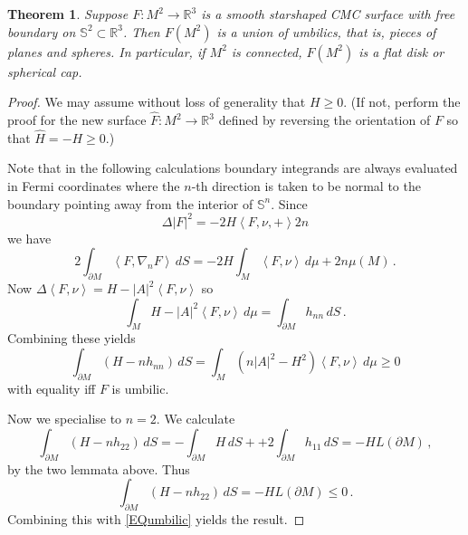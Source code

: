 \documentclass[10pt]{amsart}
\newcommand{\IP}[2]{\left< #1 , #2 \right>}
\newcommand{\R}{\ensuremath{\mathbb{R}}}
\renewcommand{\S}{\ensuremath{\mathbb{S}}}
\newtheorem{thm}{Theorem}[section]
\theoremstyle{remark}
\begin{document}
\begin{thm}
Suppose $F:M^2\rightarrow\R^3$ is a smooth starshaped CMC surface with free boundary on
$\S^2\subset\R^{3}$.
Then $F(M^2)$ is a union of umbilics, that is, pieces of planes and spheres. In
particular, if $M^2$ is connected, $F(M^2)$ is a flat disk or spherical cap.
\end{thm}
\begin{proof}
We may assume without loss of generality that $H \ge 0$. (If not, perform the
proof for the new surface $\hat F:M^2\rightarrow\R^3$ defined by reversing the
orientation of $F$ so that $\hat H = -H \ge 0$.)

Note that in the following calculations boundary integrands are always
evaluated in Fermi coordinates where the $n$-th direction is taken to be normal
to the boundary pointing away from the interior of $\S^n$.
Since
\[
\Delta |F|^2 = -2H\IP{F,\nu} + 2n
\]
we have
\[
2\int_{\partial M} \IP{F}{\nabla_n F}\,dS
 = -2H\int_M \IP{F}{\nu}\,d\mu + 2n\mu(M)
\,.
\]
Now $\Delta \IP{F}{\nu} = H - |A|^2\IP{F}{\nu}$ so
\[
\int_M H-|A|^2\IP{F}{\nu}\,d\mu
 = \int_{\partial M} h_{nn}\,dS
\,.
\]
Combining these yields
\begin{equation}
\int_{\partial M} (H - nh_{nn})\,dS
 = \int_M (n|A|^2 - H^2)\IP{F}{\nu}\,d\mu
 \ge 0
\label{EQumbilic}
\end{equation}
with equality iff $F$ is umbilic.

Now we specialise to $n=2$. We calculate
\[
\int_{\partial M} (H-nh_{22})\,dS
 = -\int_{\partial M} H\,dS +
  + 2\int_{\partial M} h_{11}\,dS
 = -HL(\partial M)
\,,
\]
by the two lemmata above.
Thus
\[
\int_{\partial M} (H-nh_{22})\,dS
 = -HL(\partial M)
 \le 0
\,.
\]
Combining this with \eqref{EQumbilic} yields the result.
\end{proof}
\end{document}
